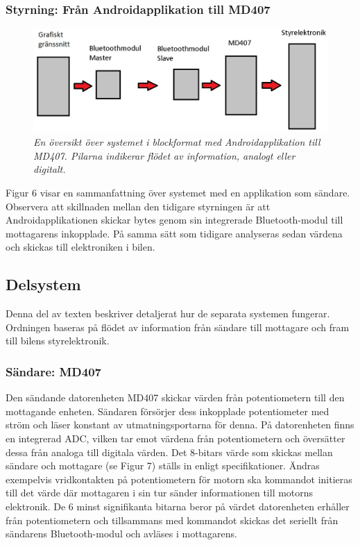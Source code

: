 \documentclass[a4paper]{article}
\begin{document}
\subsubsection{Styrning: Från Androidapplikation till MD407}
\begin{figure}[H]
\includegraphics[width=\textwidth]{systemoversiktAndroid.jpg}
\centering
\caption{\it En översikt över systemet i blockformat med Androidapplikation till MD407. Pilarna indikerar flödet av information, analogt eller digitalt.}
\end{figure} 

Figur 6 visar en sammanfattning över systemet med en applikation som sändare. Observera att skillnaden mellan den tidigare styrningen är att Androidapplikationen skickar bytes genom sin integrerade Bluetooth-modul till mottagarens inkopplade. På samma sätt som tidigare analyseras sedan värdena och skickas till elektroniken i bilen.


\subsection{Delsystem}
Denna del av texten beskriver detaljerat hur de separata systemen fungerar. Ordningen baseras på flödet av information från sändare till mottagare och fram till bilens styrelektronik.




\subsubsection{Sändare: MD407}
Den sändande datorenheten MD407 skickar värden från potentiometern till den mottagande enheten. Sändaren försörjer dess inkopplade potentiometer med ström och läser konstant av utmatningsportarna för denna. På datorenheten finns en integrerad ADC, vilken tar emot värdena från potentiometern och översätter dessa från analoga till digitala värden. Det 8-bitars värde som skickas mellan sändare och mottagare (se Figur 7) ställs in enligt specifikationer. Ändras exempelvis vridkontakten på potentiometern för motorn ska kommandot initieras till det värde där mottagaren i sin tur sänder informationen till motorns elektronik. De 6 minst signifikanta bitarna beror på värdet datorenheten erhåller från potentiometern och tillsammans med kommandot skickas det seriellt från sändarens Bluetooth-modul och avläses i mottagarens.
\end{document}
